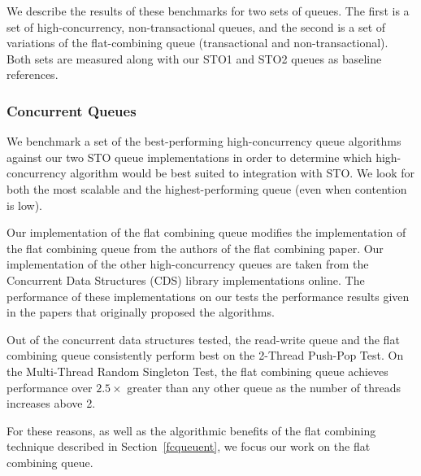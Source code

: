 We describe the results of these benchmarks for two sets of queues. The first is a set of high-concurrency, non-transactional queues, and the second is a set of variations of the flat-combining queue (transactional and non-transactional). Both sets are measured along with our STO1 and STO2 queues as baseline references.

\subsubsection{Concurrent Queues}

We benchmark a set of the best-performing high-concurrency queue algorithms against our two STO queue implementations in order to determine which high-concurrency algorithm would be best suited to integration with STO. We look for both the most scalable and the highest-performing queue (even when contention is low).
 
 Our implementation of the flat combining queue modifies the implementation of the flat combining queue from the authors of the flat combining paper\cite{flatcombining}. Our implementation of the other high-concurrency queues are taken from the Concurrent Data Structures (CDS) library implementations online\cite{libcds}. The performance of these implementations on our tests the performance results given in the papers that originally proposed the algorithms.
\iffalse
\begin{figure}[ht!]
\centering
\texttt{[image: concurrent/Q:PushPop.png]}
\caption{Performance of Concurrent Queue Algorithms}
\label{fig:concurrent_queues_pushpop}
\end{figure}

\begin{figure}[ht!]
\centering
\texttt{[image: concurrent/Q:RandSingleOps10000.png]}
\texttt{[image: concurrent/Q:RandSingleOps50000.png]}
\texttt{[image: concurrent/Q:RandSingleOps100000.png]}
\caption{Performance of Concurrent Queue Algorithms}
\label{fig:concurrent_queues_rand}
\end{figure}
\fi
Out of the concurrent data structures tested, the read-write queue\cite{queue1} and the flat combining queue consistently perform best on the 2-Thread Push-Pop Test. On the Multi-Thread Random Singleton Test, the flat combining queue achieves performance over $2.5\times$ greater than any other queue as the number of threads increases above 2.

For these reasons, as well as the algorithmic benefits of the flat combining technique described in Section~\ref{fcqueuent}, we focus our work on the flat combining queue.

